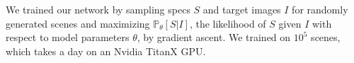 \documentclass{article}
\newcommand{\probability}{\mathds{P}} %
\theoremstyle{definition}
\begin{document}
We trained our network by sampling specs $S$ and target
images $I$ for randomly generated scenes
and maximizing $\probability_\theta[S|I]$,
 the likelihood of $S$ given $I$ with respect to
  model parameters $\theta$, by gradient ascent.
We trained on $10^5$ scenes, which takes a day on an Nvidia TitanX GPU.

\end{document}
